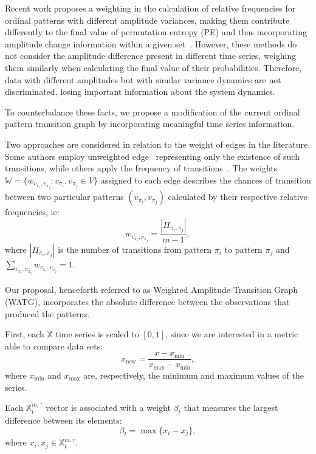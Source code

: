 \documentclass{isprs}
\begin{document}
	Recent work proposes a weighting in the calculation of relative frequencies for ordinal patterns with different amplitude variances, making them contribute differently to the final value of permutation entropy (PE) and thus incorporating amplitude change information within a given set~\cite{Fadlallah2013Weightedpermutation}.
	However, these methods do not consider the amplitude difference present in different time series, weighing them similarly when calculating the final value of their probabilities.
	Therefore, data with different amplitudes but with similar variance dynamics are not discriminated, losing important information about the system dynamics.
	
	To counterbalance these facts, we propose a modification of the current ordinal pattern transition graph by incorporating meaningful time series information.
	
	Two approaches are considered in relation to the weight of edges in the literature.
	Some authors employ unweighted edge~\cite{McCullough2015lagged,Kulp2016ordinal} representing only the existence of such transitions, while others apply the frequency of transitions~\cite{Sorrentino2015periodic,Zhang2017ConstructingOP}.
	The weights $\mathbb{W} = \{w_{v_{\pi_i}, v_{\pi_j}}: v_{\pi_i}, v_{\pi_j} \in V \}$ assigned to each edge describes the chances of transition between two particular patterns $(v_{\pi_i}, v_{\pi_j})$ calculated by their respective relative frequencies, ie:	
	\begin{equation}
	w_{v_{\pi_i}, v_{\pi_j}} = \frac{|\Pi_{\pi_i,\pi_j}|}{m-1},
	\end{equation}
	where $|\Pi_{\pi_i,\pi_j}|$ is the number of transitions from pattern $\pi_i$ to pattern $\pi_j$ and $\sum_{v_{\pi_i}, v_{\pi_j}}w_{v_{\pi_i}, v_{\pi_j}} = 1$.
	
	Our proposal, henceforth referred to as Weighted Amplitude Transition Graph (WATG), incorporates the absolute difference between the observations that produced the patterns.
	
	First, each $\mathbb{X}$ time series is scaled to $[0, 1]$, since we are interested in a metric able to compare data sets:
	\begin{equation}
	x_{\text{new}} = \frac{x - x_{\min}}{x_{\max} - x_{\min}},
	\end{equation}
	where $x_{\min}$ and $x_{\max}$ are, respectively, the minimum and maximum values of the series.
	
	Each $\mathbb{X}^{m, \tau}_t$ vector is associated with a weight $\beta_t$ that measures the largest difference between its elements:
	\begin{equation}
	\beta_t = \max\{x_i - x_j\},
	\end{equation}
	where $x_i, x_j \in \mathbb{X}^{m, \tau}_t$.
	
\end{document}
